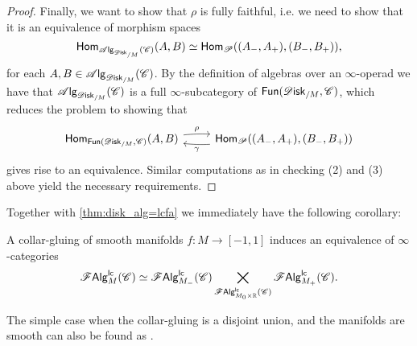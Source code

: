 \documentclass[../text]{subfiles}
\begin{document}
\begin{proof}
    Finally, we want to show that $\rho$ is fully faithful, i.e. we need to show that it is an equivalence of morphism spaces
    \begin{equation}
        \mathsf{Hom}_{\alg{\disk_{/M}} (\catC)}(A, B) \simeq \mathsf{Hom}_{\mathscr{P}}((A_-, A_+), (B_-, B_+)),
    \end{equation}
    for each $A, B \in \alg{\disk_{/M}} (\catC)$. By the definition of algebras over an $\infty$-operad we have that $\alg{\disk_{/M}} (\catC)$ is a full $\infty$-subcategory of $\mathsf{Fun}(\disk_{/M}, \catC)$, which reduces the problem to showing that
    \begin{equation}
        \begin{tikzcd}
            \mathsf{Hom}_{\mathsf{Fun}(\disk_{/M}, \catC)}(A, B) \arrow[r, bend left=4, "\rho"] & \mathsf{Hom}_{\mathscr{P}}((A_-, A_+), (B_-, B_+)) \arrow[l, bend left=4, "\gamma"]
        \end{tikzcd}
    \end{equation}
    gives rise to an equivalence. Similar computations as in checking (2) and (3) above yield the necessary requirements.
\end{proof}

Together with \cref{thm:disk_alg=lcfa} we immediately have the following corollary:

\begin{corollary}\label{cor:gluing_lcfas}
    A collar-gluing of smooth manifolds $f: M \rightarrow [-1,1]$ induces an equivalence of $\infty$-categories
    \begin{equation}
        \mathscr{F} \mathsf{Alg}^{\mathsf{lc}}_M (\mathscr{C}) \simeq \mathscr{F} \mathsf{Alg}^{\mathsf{lc}}_{M_-} (\mathscr{C}) \bigtimes_{\mathscr{F} \mathsf{Alg}^{\mathsf{lc}}_{M_0 \times \mathbb{R}} (\mathscr{C})} \mathscr{F} \mathsf{Alg}^{\mathsf{lc}}_{M_+}(\mathscr{C}).
    \end{equation}
\end{corollary}

\begin{remark}
    The simple case when the collar-gluing is a disjoint union, and the manifolds are smooth can also be found as \cite[ex.5.4.5.4]{lurie_ha}.
\end{remark}
\end{document}
